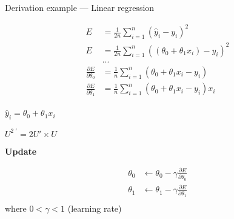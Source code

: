 \begin{frame}{Derivation example --- Linear regression}
  \begin{minipage}[l]{0.49\linewidth}
    \begin{align*}
      E & = \frac{1}{2n} \sum_{i=1}^n( \hat{y}_i - y_i )^2 \\
      E & = \frac{1}{2n}\sum_{i=1}^n( (\theta_0 + \theta_1 x_i) - y_i )^2 \\
      & ... \\
      \frac{\partial E}{\partial \theta_0} & = \frac{1}{n}\sum^n_{i=1}(\theta_0 + \theta_1 x_i - y_i) \\
      \frac{\partial E}{\partial \theta_1} & = \frac{1}{n}\sum^n_{i=1}(\theta_0 + \theta_1 x_i - y_i) x_i \\
    \end{align*}
  \end{minipage}\hfill
  \begin{minipage}[c]{0.49\linewidth}
    \begin{center}
      $\boxed{\hat{y}_i = \theta_0 + \theta_1 x_i}$
    \end{center}

    \begin{center}
      $\boxed{U^{2\;\prime}=2U' \times U}$
    \end{center}
    \vfill
    \begin{center}
      \textbf{Update}

      \begin{align*}
        \theta_0 & \leftarrow \theta_0 - \gamma\frac{\partial{E}}{\partial{\theta_0}} \\
        \theta_1 & \leftarrow \theta_1 - \gamma\frac{\partial{E}}{\partial{\theta_1}} \\
      \end{align*}
      where $0 < \gamma < 1$ (learning rate)
    \end{center}
  \end{minipage}\hfill
\end{frame}
